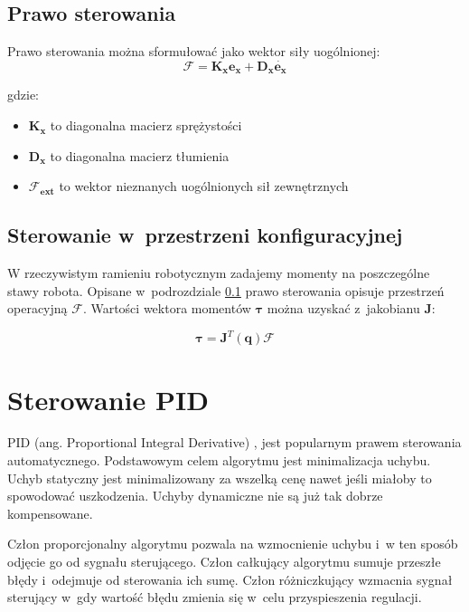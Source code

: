\subsection{Prawo sterowania}
\label{sec:impedancyjne}

Prawo sterowania można sformułować  jako wektor siły uogólnionej:
\begin{equation}
\boldsymbol{\mathcal{F}} = \boldsymbol{K_x}\boldsymbol{e_x} + \boldsymbol{D_x}\dot{\boldsymbol{e_x}}
\end{equation}

gdzie:
\begin{itemize}
\item $\boldsymbol{K_x}$ to diagonalna macierz sprężystości
\item $\boldsymbol{D_x}$ to diagonalna macierz tłumienia
\item $\boldsymbol{\mathcal{F}_{ext}}$ to wektor nieznanych uogólnionych sił zewnętrznych
\end{itemize}

\subsection{Sterowanie w~przestrzeni konfiguracyjnej}
W rzeczywistym ramieniu robotycznym zadajemy momenty na poszczególne stawy robota. Opisane w~podrozdziale \ref{sec:impedancyjne} prawo sterowania opisuje przestrzeń operacyjną $\boldsymbol{\mathcal{F}}$.  Wartości wektora momentów $\boldsymbol{\tau}$ można uzyskać z~jakobianu $\boldsymbol{J}$:

\begin{equation}
\boldsymbol{\tau} = \boldsymbol{J}^T(\boldsymbol{q})\boldsymbol{\mathcal{F}}
\end{equation}

\section{Sterowanie PID}
PID (ang. Proportional Integral Derivative) \cite{bib:pidTito}, \cite{bib:pidMimo} jest popularnym prawem sterowania automatycznego. Podstawowym celem algorytmu jest minimalizacja uchybu. Uchyb statyczny jest minimalizowany za wszelką cenę nawet jeśli miałoby to spowodować uszkodzenia. Uchyby dynamiczne nie są już tak dobrze kompensowane.

Człon proporcjonalny algorytmu pozwala na wzmocnienie uchybu i~w ten sposób odjęcie go od sygnału sterującego. Człon całkujący algorytmu sumuje przeszłe błędy i~odejmuje od sterowania ich sumę. Człon różniczkujący wzmacnia sygnał sterujący w~gdy wartość błędu zmienia się w~celu przyspieszenia regulacji.
